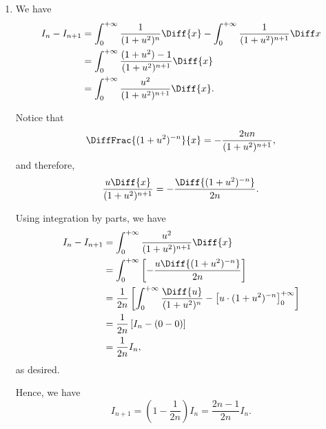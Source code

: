 \Question{\currfilebase}

\begin{enumerate}
    \item We have
          \begin{align*}
              I_n - I_{n + 1} & = \int_0^{+\infty} \frac{1}{(1 + u^2)^n} \Diff{x} - \int_0^{+\infty} \frac{1}{(1 + u^2)^{n + 1}} \Diff x \\
                              & = \int_0^{+\infty} \frac{(1 + u^2) - 1}{(1 + u^2)^{n + 1}} \Diff{x}                                      \\
                              & = \int_0^{+\infty} \frac{u^2}{(1 + u^2)^{n + 1}} \Diff{x}.
          \end{align*}

          Notice that
          \[
              \DiffFrac{(1 + u^2)^{-n}}{x} = - \frac{2un}{(1 + u^2)^{n + 1}},
          \]
          and therefore,
          \[
              \frac{u\Diff{x}}{(1 + u^2)^{n + 1}} = - \frac{\Diff{(1 + u^2)^{-n}}}{2n}.
          \]

          Using integration by parts, we have
          \begin{align*}
              I_n - I_{n + 1} & = \int_0^{+\infty} \frac{u^2}{(1 + u^2)^{n + 1}} \Diff{x}                                                                  \\
                              & = \int_0^{+\infty} \left[ - \frac{u\Diff{(1 + u^2)^{-n}}}{2n}\right]                                                       \\
                              & = \frac{1}{2n}\left[\int_0^{+\infty} \frac{\Diff{u}}{(1 + u^2)^n} - \left[u \cdot (1 + u^2)^{-n}\right]^{+\infty}_0\right] \\
                              & = \frac{1}{2n} \left[I_n - (0 - 0)\right]                                                                                  \\
                              & = \frac{1}{2n} I_n,
          \end{align*}
          as desired.

          Hence, we have
          \[
              I_{n + 1} = \left(1 - \frac{1}{2n}\right) I_n = \frac{2n - 1}{2n} I_n.
          \]


\end{enumerate}
